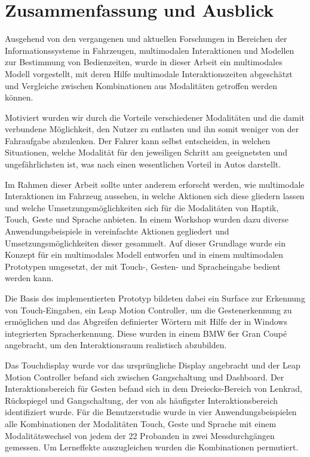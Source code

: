 \chapter{Zusammenfassung und Ausblick}\label{cha:Zusamenfassung}
Ausgehend von den vergangenen und aktuellen Forschungen in Bereichen der Informationssysteme in Fahrzeugen, multimodalen Interaktionen und Modellen zur Bestimmung von Bedienzeiten, wurde in dieser Arbeit ein multimodales Modell vorgestellt, mit deren Hilfe multimodale Interaktionszeiten abgeschätzt und Vergleiche zwischen Kombinationen aus Modalitäten getroffen werden können.

Motiviert wurden wir durch die Vorteile verschiedener Modalitäten und die damit verbundene Möglichkeit, den Nutzer zu entlasten und ihn somit weniger von der Fahraufgabe abzulenken.
Der Fahrer kann selbst entscheiden, in welchen Situationen, welche Modalität für den jeweiligen Schritt am geeignetsten und ungefährlichsten ist, was nach \citet{Muller_2011} einen wesentlichen Vorteil in Autos darstellt.

Im Rahmen dieser Arbeit sollte unter anderem erforscht werden, wie multimodale Interaktionen im Fahrzeug aussehen, in welche Aktionen sich diese gliedern lassen und welche Umsetzungsmöglichkeiten sich für die Modalitäten von Haptik, Touch, Geste und Sprache anbieten.
In einem Workshop wurden dazu diverse Anwendungsbeispiele in vereinfachte Aktionen gegliedert und Umsetzungsmöglichkeiten dieser gesammelt.
Auf dieser Grundlage wurde ein Konzept für ein multimodales Modell entworfen und in einem multimodalen Prototypen umgesetzt, der mit Touch-, Gesten- und Spracheingabe bedient werden kann.

Die Basis des implementierten Prototyp bildeten dabei ein Surface zur Erkennung von Touch-Eingaben, ein Leap Motion Controller, um die  Gestenerkennung zu ermöglichen und das Abgreifen definierter Wörtern mit Hilfe der in Windows integrierten Spracherkennung.  
Diese wurden in einem BMW 6er Gran Coupé angebracht, um den Interaktionsraum realistisch abzubilden. 

Das Touchdisplay wurde vor das ursprüngliche Display angebracht und der Leap Motion Controller befand sich zwischen Gangschaltung und Dashboard. 
Der Interaktionsbereich für Gesten befand sich in dem Dreiecks-Bereich von Lenkrad, Rückspiegel und Gangschaltung, der von \citet{Riener:2013:SIG} als häufigster Interaktionsbereich identifiziert wurde.
Für die Benutzerstudie wurde in vier Anwendungsbeispielen alle Kombinationen der Modalitäten Touch, Geste und Sprache mit einem Modalitätswechsel von jedem der 22 Probanden in zwei Messdurchgängen gemessen. 
Um Lerneffekte auszugleichen wurden die Kombinationen permutiert.

